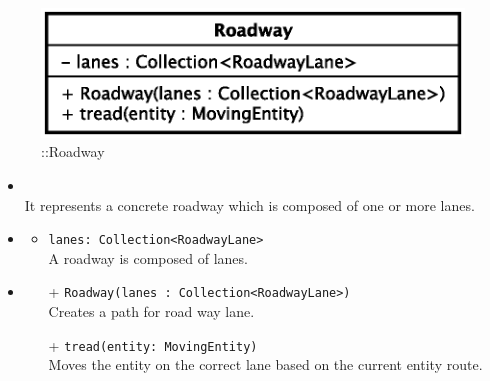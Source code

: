 \begin{figure}[h]
\centering
\includegraphics[scale=0.6,keepaspectratio]{images/solution/app/backend/roadway.eps}
\caption{\pReactiveComponent::Roadway}
\label{fig:sd-app-roadway}
\end{figure}
\FloatBarrier
\begin{itemize}
  \item \textbf{\descr} \\
    It represents a concrete roadway which is composed of one or more lanes.
  \item \textbf{\attrs}
  \begin{itemize}
    \item \texttt{lanes: Collection<RoadwayLane>} \\
A roadway is composed of lanes.
  \end{itemize}
  \item \textbf{\ops}
  \begin{itemize}
  \item[+] \texttt{Roadway(lanes : Collection<RoadwayLane>)} \\
    Creates a path for road way lane.
    \item[+] \texttt{tread(entity: MovingEntity)} \\
Moves the entity on the correct lane based on the current entity route. 
  \end{itemize}
\end{itemize}
